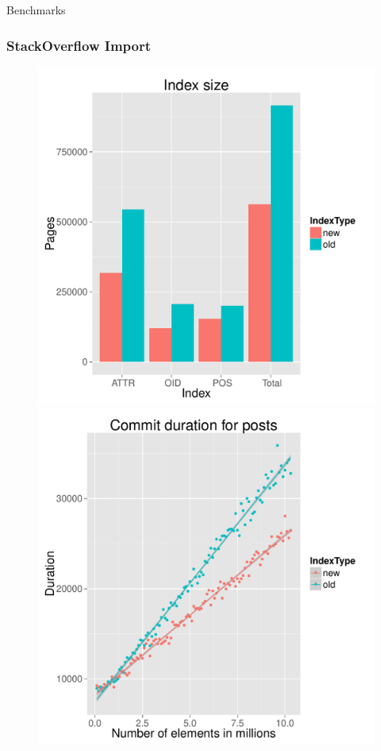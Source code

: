\documentclass{beamer}
\begin{document}
\begin{section}{Benchmarks}
    \begin{frame}
      \frametitle{StackOverflow Import}
        \begin{figure}
          \includegraphics[scale=0.28]{images/SO_sizes.pdf}
          \quad
          \pause
          \includegraphics[scale=0.28]{images/SO_commit_duration.pdf}
        \end{figure}
    \end{frame}
  \end{section}
\end{document}

